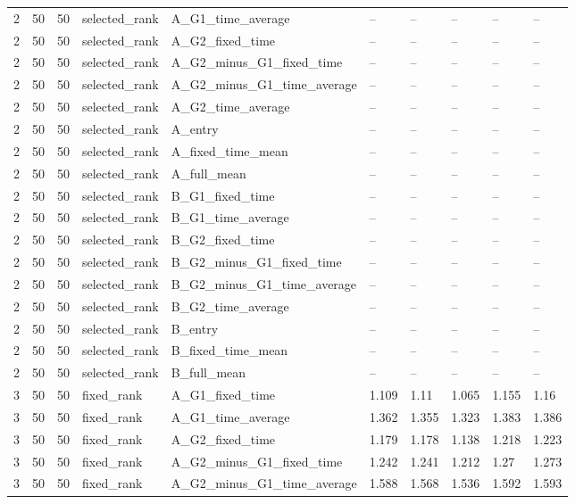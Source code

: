\begin{longtable}{llllllllll}
2 & 50 & 50 & selected\_rank & A\_G1\_time\_average & -- & -- & -- & -- & -- \\
2 & 50 & 50 & selected\_rank & A\_G2\_fixed\_time & -- & -- & -- & -- & -- \\
2 & 50 & 50 & selected\_rank & A\_G2\_minus\_G1\_fixed\_time & -- & -- & -- & -- & -- \\
2 & 50 & 50 & selected\_rank & A\_G2\_minus\_G1\_time\_average & -- & -- & -- & -- & -- \\
2 & 50 & 50 & selected\_rank & A\_G2\_time\_average & -- & -- & -- & -- & -- \\
2 & 50 & 50 & selected\_rank & A\_entry & -- & -- & -- & -- & -- \\
2 & 50 & 50 & selected\_rank & A\_fixed\_time\_mean & -- & -- & -- & -- & -- \\
2 & 50 & 50 & selected\_rank & A\_full\_mean & -- & -- & -- & -- & -- \\
2 & 50 & 50 & selected\_rank & B\_G1\_fixed\_time & -- & -- & -- & -- & -- \\
2 & 50 & 50 & selected\_rank & B\_G1\_time\_average & -- & -- & -- & -- & -- \\
2 & 50 & 50 & selected\_rank & B\_G2\_fixed\_time & -- & -- & -- & -- & -- \\
2 & 50 & 50 & selected\_rank & B\_G2\_minus\_G1\_fixed\_time & -- & -- & -- & -- & -- \\
2 & 50 & 50 & selected\_rank & B\_G2\_minus\_G1\_time\_average & -- & -- & -- & -- & -- \\
2 & 50 & 50 & selected\_rank & B\_G2\_time\_average & -- & -- & -- & -- & -- \\
2 & 50 & 50 & selected\_rank & B\_entry & -- & -- & -- & -- & -- \\
2 & 50 & 50 & selected\_rank & B\_fixed\_time\_mean & -- & -- & -- & -- & -- \\
2 & 50 & 50 & selected\_rank & B\_full\_mean & -- & -- & -- & -- & -- \\
3 & 50 & 50 & fixed\_rank & A\_G1\_fixed\_time & 1.109 & 1.11 & 1.065 & 1.155 & 1.16 \\
3 & 50 & 50 & fixed\_rank & A\_G1\_time\_average & 1.362 & 1.355 & 1.323 & 1.383 & 1.386 \\
3 & 50 & 50 & fixed\_rank & A\_G2\_fixed\_time & 1.179 & 1.178 & 1.138 & 1.218 & 1.223 \\
3 & 50 & 50 & fixed\_rank & A\_G2\_minus\_G1\_fixed\_time & 1.242 & 1.241 & 1.212 & 1.27 & 1.273 \\
3 & 50 & 50 & fixed\_rank & A\_G2\_minus\_G1\_time\_average & 1.588 & 1.568 & 1.536 & 1.592 & 1.593 \\

\end{longtable}
